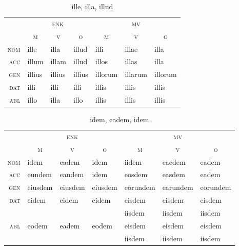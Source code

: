 \documentclass[12pt,a4paper]{article}
\begin{document}
\begin{table}[H]
\centering
\begin{tabular}{ r | l l l | l l l }
\toprule
 & \multicolumn{3}{c|}{\textsc{enk}} & \multicolumn{3}{c}{\textsc{mv}} \\
 & \multicolumn{1}{c}{\textsc{m}} & \multicolumn{1}{c}{\textsc{v}} & \multicolumn{1}{c|}{\textsc{o}} & \multicolumn{1}{c}{\textsc{m}} & \multicolumn{1}{c}{\textsc{v}} & \multicolumn{1}{c}{\textsc{o}} \\ 
\midrule
\textsc{nom} & ille   & illa   & illud  & illi    & illae   & illa  \\
\textsc{acc} & illum  & illam  & illud  & illos   & illas   & illa  \\
\textsc{gen} & illius & illius & illius & illorum & illarum & illorum \\
\textsc{dat} & illi   & illi   & illi   & illis   & illis   & illis   \\
\textsc{abl} & illo   & illa   & illo   & illis   & illis   & illis   \\
\bottomrule
\end{tabular}
\caption{ille, illa, illud}
\label{tab:ille}
\end{table}

\begin{table}[H]
\centering
\begin{tabular}{ r | l l l | l l l }
\toprule
 & \multicolumn{3}{c|}{\textsc{enk}} & \multicolumn{3}{c}{\textsc{mv}} \\
 & \multicolumn{1}{c}{\textsc{m}} & \multicolumn{1}{c}{\textsc{v}} & \multicolumn{1}{c|}{\textsc{o}} & \multicolumn{1}{c}{\textsc{m}} & \multicolumn{1}{c}{\textsc{v}} & \multicolumn{1}{c}{\textsc{o}} \\ 
\midrule
\textsc{nom} & idem    & eadem   & idem    & iidem    & eaedem   & eadem    \\
\textsc{acc} & eundem  & eandem  & idem    & eosdem   & easdem   & eadem    \\
\textsc{gen} & eiusdem & eiusdem & eiusdem & eorundem & earundem & eorundem \\
\multirow{2}{*}{\textsc{dat}} & \multirow{2}{*}{eidem}   & \multirow{2}{*}{eidem}   & \multirow{2}{*}{eidem}   & eisdem   & eisdem   & eisdem   \\
             &         &         &         & iisdem   & iisdem   & iisdem   \\
\multirow{2}{*}{\textsc{abl}} & \multirow{2}{*}{eodem}   & \multirow{2}{*}{eadem}   & \multirow{2}{*}{eodem}   & eisdem   & eisdem   & eisdem   \\
             &         &         &         & iisdem   & iisdem   & iisdem   \\
\bottomrule
\end{tabular}
\caption{idem, eadem, idem}
\label{tab:idem}
\end{table}
\end{document}

